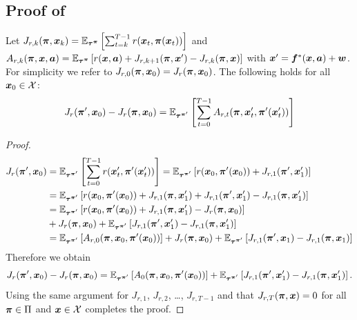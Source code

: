 \subsection{Proof of }
\begin{lemma}
Let $J_{r, k}({\bm{\pi}}, {\bm{x}}_k) =  \mathbb{E}_{{\bm{\tau}}^{{\bm{\pi}}}}\left[\sum_{t=k}^{T-1} r({\bm{x}}_t, {\bm{\pi}}({\bm{x}}_{t}))\right]$ and $A_{r, k}({\bm{\pi}}, {\bm{x}}, {\bm{a}}) =  \mathbb{E}_{{\bm{\tau}}^{{\bm{\pi}}}}\left[r({\bm{x}}, {\bm{a}}) + J_{r, k + 1}({\bm{\pi}}, {\bm{x}}') - J_{r, k}({\bm{\pi}}, {\bm{x}}) \right]$ with ${\bm{x}}' = {\bm{f}}^*({\bm{x}}, {\bm{a}}) + {\bm{w}}$. For simplicity we refer to  $J_{r, 0}({\bm{\pi}}, {\bm{x}}_0) = J_r ({\bm{\pi}}, {\bm{x}}_0)$. 
The following holds for all ${\bm{x}}_0 \in {\mathcal{X}}$:
\begin{equation*}
    J_r ({\bm{\pi}}', {\bm{x}}_0) -  J_r ({\bm{\pi}}, {\bm{x}}_0) = \mathbb{E}_{{\bm{\tau}}^{{\bm{\pi}}'}} \left[\sum^{T-1}_{t=0} A_{r, t}({\bm{\pi}}, {\bm{x}}'_t, {\bm{\pi}}'({\bm{x}}'_t))\right]
\end{equation*}
\label{lemma:Difference in policy}
\end{lemma}
\begin{proof}
    \begin{align*}
         J_r ({\bm{\pi}}', {\bm{x}}_0) &= \mathbb{E}_{{\bm{\tau}}^{{\bm{\pi}}'}} \left[\sum^{T-1}_{t=0} r({\bm{x}}'_t, {\bm{\pi}}'({\bm{x}}'_t))\right] = \mathbb{E}_{{\bm{\tau}}^{{\bm{\pi}}'}} \left[r({\bm{x}}_0, {\bm{\pi}}'({\bm{x}}_0)) + J_{r, 1}({\bm{\pi}}', {\bm{x}}'_1)\right] \\
         &= \mathbb{E}_{{\bm{\tau}}^{{\bm{\pi}}'}}  \left[r({\bm{x}}_0, {\bm{\pi}}'({\bm{x}}_0)) + J_{r, 1}({\bm{\pi}}, {\bm{x}}'_1) + J_{r, 1}({\bm{\pi}}', {\bm{x}}'_1) - J_{r, 1}({\bm{\pi}}, {\bm{x}}'_1)\right] \\
         &= \mathbb{E}_{{\bm{\tau}}^{{\bm{\pi}}'}}  \left[r({\bm{x}}_0, {\bm{\pi}}'({\bm{x}}_0)) + J_{r, 1}({\bm{\pi}}, {\bm{x}}'_1) - J_r({\bm{\pi}}, {\bm{x}}_0)\right] \\
         &+ J_r({\bm{\pi}}, {\bm{x}}_0) + \mathbb{E}_{{\bm{\tau}}^{{\bm{\pi}}'}}  \left[J_{r, 1}({\bm{\pi}}', {\bm{x}}'_1) - J_{r, 1}({\bm{\pi}}, {\bm{x}}'_1)\right] \\
        &= \mathbb{E}_{{\bm{\tau}}^{{\bm{\pi}}'}}  \left[A_{r, 0}({\bm{\pi}}, {\bm{x}}_0, {\bm{\pi}}'({\bm{x}}_0))\right] + J_r({\bm{\pi}}, {\bm{x}}_0) + \mathbb{E}_{{\bm{\tau}}^{{\bm{\pi}}'}}  \left[J_{r, 1}({\bm{\pi}}', {\bm{x}}_1) - J_{r, 1}({\bm{\pi}}, {\bm{x}}_1)\right]
    \end{align*}
    Therefore we obtain
    \begin{equation*}
        J_r ({\bm{\pi}}', {\bm{x}}_0) - J_r({\bm{\pi}}, {\bm{x}}_0) = \mathbb{E}_{{\bm{\tau}}^{{\bm{\pi}}'}}  \left[A_0({\bm{\pi}}, {\bm{x}}_0, {\bm{\pi}}'({\bm{x}}_0))\right] +  \mathbb{E}_{{\bm{\tau}}^{{\bm{\pi}}'}}  \left[J_{r, 1}({\bm{\pi}}', {\bm{x}}'_1) - J_{r, 1}({\bm{\pi}}, {\bm{x}}'_1)\right].
    \end{equation*}
    Using the same argument for $J_{r, 1}$, $J_{r, 2}$, \dots, $J_{r, T-1}$ and that $J_{r, T}({\bm{\pi}}, {\bm{x}}) = 0$ for all ${\bm{\pi}} \in \Pi$ and ${\bm{x}} \in {\mathcal{X}}$ completes the proof.
\end{proof}
